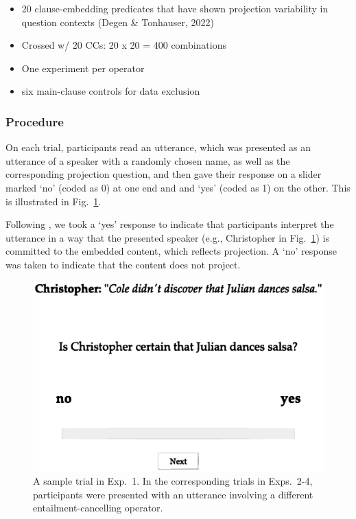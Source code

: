\documentclass[a4paper,12pt,twoside]{article}
\begin{document}
			\begin{itemize}
				\item 20 clause-embedding predicates that have shown projection variability in question contexts (Degen \& Tonhauser, 2022)
				\item Crossed w/ 20 CCs: 20 x 20 = 400 combinations
				\item One experiment per operator
				\item six main-clause controls for data exclusion
			\end{itemize}

		\subsubsection{Procedure}

			On each trial, participants read an utterance, which was presented as an utterance of a speaker with a randomly chosen name, as well as the corresponding projection question, and then gave their response on a slider marked `no' (coded as 0) at one end and and `yes' (coded as 1) on the other. This is illustrated in Fig.~\ref{fig:trial}.

			Following \citet{tonhauser_how_2018}, we took a `yes' response to indicate that participants interpret the utterance in a way that the presented speaker (e.g., Christopher in Fig.~\ref{fig:trial}) is committed to the embedded content, which reflects projection. A `no' response was taken to indicate that the content does not project.

			\begin{figure}[ht]
				\centering
				\includegraphics[width = .7\linewidth]{task-1n-proj.eps}
				\caption{A sample trial in Exp.~1. In the corresponding trials in Exps.~2-4, participants were presented with an utterance involving a different entailment-cancelling operator.}
				\label{fig:trial}
			\end{figure}
		
\end{document}
